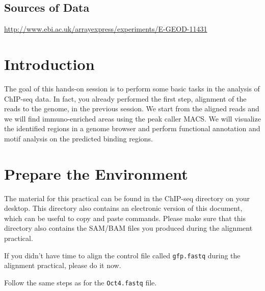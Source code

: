 \subsection{Sources of Data}
  \url{http://www.ebi.ac.uk/arrayexpress/experiments/E-GEOD-11431}

\newpage

\section{Introduction}

\begin{information}
The goal of this hands-on session is to perform some basic tasks in the analysis
of ChIP-seq data. In fact, you already performed the first step, alignment of
the reads to the genome, in the previous session. We start from the aligned
reads and we will find immuno-enriched areas using the peak caller MACS. We will
visualize the identified regions in a genome browser and perform functional
annotation and motif analysis on the predicted binding regions.
\end{information}

\section{Prepare the Environment}

\begin{information}
The material for this practical can be found in the ChIP-seq directory on your
desktop. This directory also contains an electronic version of this document,
which can be useful to copy and paste commands. Please make sure that this
directory also contains the SAM/BAM files you produced during the alignment
practical.
\end{information}

\begin{steps}
If you didn't have time to align the control file called \texttt{gfp.fastq} during the
alignment practical, please do it now.

Follow the same steps as for the \texttt{Oct4.fastq} file.
\end{steps}

